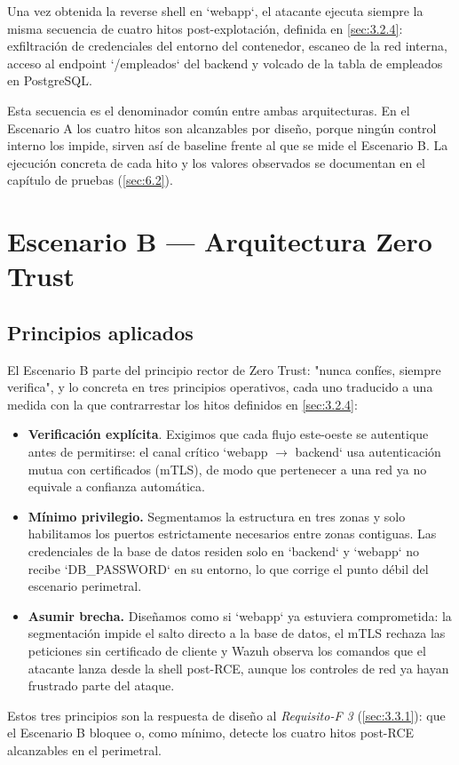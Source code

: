 \documentclass[11pt,spanish,listoffigures,listoftables]{tfgetsinf}
\begin{document}
        Una vez obtenida la reverse shell en `webapp`, el atacante ejecuta siempre la misma secuencia de cuatro hitos post-explotación, definida en \cref{sec:3.2.4}: exfiltración de credenciales del entorno del contenedor, escaneo de la red interna, acceso al endpoint `/empleados` del backend y volcado de la tabla de empleados en PostgreSQL.
        
        Esta secuencia es el denominador común entre ambas arquitecturas. En el Escenario A los cuatro hitos son alcanzables por diseño, porque ningún control interno los impide, sirven así de baseline frente al que se mide el Escenario B. La ejecución concreta de cada hito y los valores observados se documentan en el capítulo de pruebas (\cref{sec:6.2}).

    \section{Escenario B — Arquitectura Zero Trust}
        \subsection{Principios aplicados}
        \label{sec:4.3.1}
        El Escenario B parte del principio rector de Zero Trust: "nunca confíes, siempre verifica", y lo concreta en tres principios operativos, cada uno traducido a una medida con la que contrarrestar los hitos definidos en \cref{sec:3.2.4}:
        \begin{itemize}
            \item \textbf{Verificación explícita}. Exigimos que cada flujo este-oeste se autentique antes de permitirse: el canal crítico `webapp $\rightarrow$ backend` usa autenticación mutua con certificados (mTLS), de modo que pertenecer a una red ya no equivale a confianza automática.
            \item \textbf{Mínimo privilegio.} Segmentamos la estructura en tres zonas y solo habilitamos los puertos estrictamente necesarios entre zonas contiguas. Las credenciales de la base de datos residen solo en `backend` y `webapp` no recibe `DB\_PASSWORD` en su entorno, lo que corrige el punto débil del escenario perimetral.
            \item \textbf{Asumir brecha.} Diseñamos como si `webapp` ya estuviera comprometida: la segmentación impide el salto directo a la base de datos, el mTLS rechaza las peticiones sin certificado de cliente y Wazuh observa los comandos que el atacante lanza desde la shell post-RCE, aunque los controles de red ya hayan frustrado parte del ataque.
        \end{itemize}
        Estos tres principios son la respuesta de diseño al \textit{Requisito-F 3} (\cref{sec:3.3.1}): que el Escenario B bloquee o, como mínimo, detecte los cuatro hitos post-RCE alcanzables en el perimetral.
        
\end{document}
